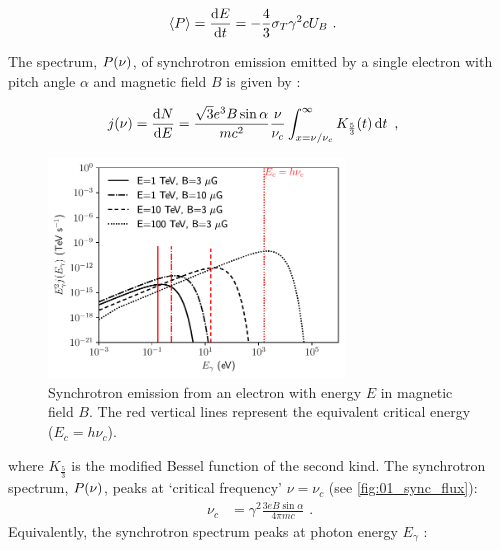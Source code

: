 \begin{equation}
    \begin{aligned}
    \left\langle P\right\rangle&=\dv{E}{t}=-\frac{4}{3}\sigma_T\gamma^2 c U_B\text{ .}
    \end{aligned} \label{eq:01_leptonic_sync_energy_loss}
\end{equation}

The spectrum, $P\qty(\nu)$, of synchrotron emission emitted by a single electron with pitch angle $\alpha$ and magnetic field $B$ is given by \citep{2007A&A...474..689M}:

\begin{equation}
    \begin{aligned}
    j \qty(\nu)&=\dv{N}{E}=\frac{\sqrt{3}e^3B\sin\alpha}{mc^2}\frac{\nu}{\nu_c}\int_{x=\nu/\nu_c}^{\infty}K_\frac{5}{3}\qty(t)\dd{t}\text{ ,}
    \end{aligned} \label{eq:01_nontherm_sync_indiv}
\end{equation}
\begin{figure}
    \centering
    \includegraphics[width=0.7\textwidth]{04_Introduction/Images/non_thermal_emission/synchrotron_spectrum.pdf}
    \caption{Synchrotron emission from an electron with energy $E$ in magnetic field $B$. The red vertical lines represent the equivalent critical energy ($E_c=h\nu_c$).}
    \label{fig:01_sync_flux}
\end{figure}
\noindent where $K_\frac{5}{3}$ is the modified Bessel function of the second kind. The synchrotron spectrum, $P\qty(\nu)$, peaks at `critical frequency' $\nu=\nu_c$ (see \autoref{fig:01_sync_flux}):
\begin{equation}
    \begin{aligned}
    \nu_c&=\gamma^2\frac{3eB\sin\alpha}{4\pi mc}\text{ .}
    \end{aligned}
\end{equation}
\noindent Equivalently, the synchrotron spectrum peaks at photon energy $E_\gamma$ \citep{2009ARA&A..47..523H}:

